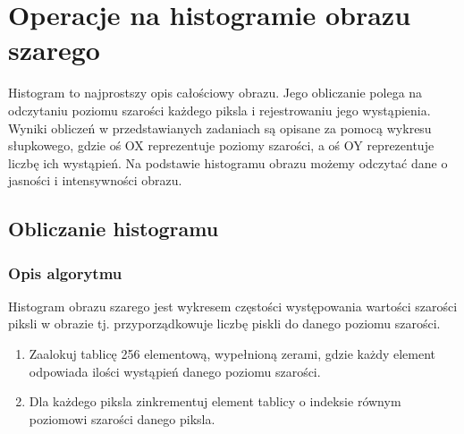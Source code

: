 \documentclass[a4paper,12pt, titlepage]{report}
\begin{document}
\chapter{Operacje na histogramie obrazu szarego}
\par Histogram to najprostszy opis całościowy obrazu. Jego obliczanie polega na odczytaniu poziomu szarości każdego piksla i rejestrowaniu jego wystąpienia. Wyniki obliczeń w przedstawianych zadaniach są opisane za pomocą wykresu słupkowego, gdzie oś OX reprezentuje poziomy szarości, a oś OY reprezentuje liczbę ich wystąpień. Na podstawie histogramu obrazu możemy odczytać dane o jasności i intensywności obrazu.

\section{Obliczanie histogramu}
\subsection*{Opis algorytmu}
\par Histogram obrazu szarego jest wykresem częstości występowania wartości szarości piksli w obrazie tj. przyporządkowuje liczbę piskli do danego poziomu szarości.
\begin{enumerate}
\item Zaalokuj tablicę 256 elementową, wypełnioną zerami, gdzie każdy element odpowiada ilości wystąpień danego poziomu szarości.
\item Dla każdego piksla zinkrementuj element tablicy o indeksie równym poziomowi szarości danego piksla.
\end{enumerate}
\end{document}
